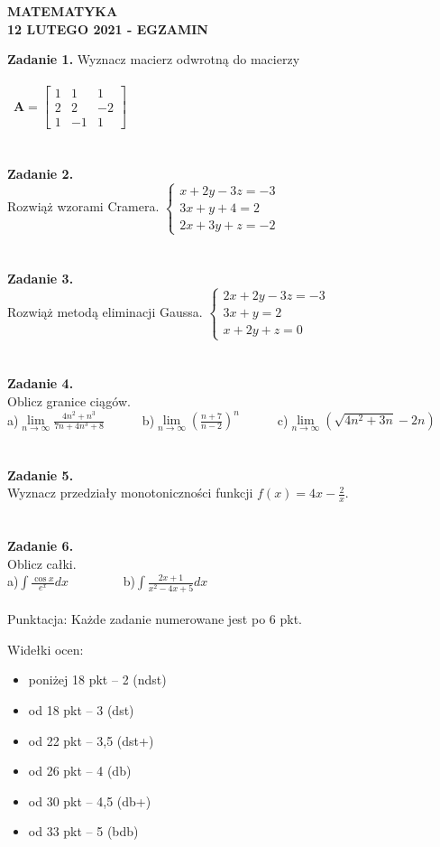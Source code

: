 \documentclass[12pt,a4paper]{report}
\begin{document}
\begin{center}

\textbf{MATEMATYKA \\12 LUTEGO 2021 - EGZAMIN}

\end{center}\textbf{Zadanie 1.} Wyznacz macierz odwrotną do macierzy \\\\\ $\mathbf{A} =\left[ \begin{array}{ccc}1 & 1& 1\\2& 2& -2\\1 & -1& 1\end{array} \right]$\\\\\\\textbf{Zadanie 2.} \\Rozwiąż wzorami Cramera. $\left\{ \begin{array}{ll}x+2y-3z=-3\\ 3x+y+4=2\\2x+3y+z=-2\end{array} \right.$\\\\\\\textbf{Zadanie 3.} \\Rozwiąż metodą eliminacji Gaussa. $\left\{ \begin{array}{ll}2x+2y-3z=-3\\3x+y=2\\x+2y+z=0\end{array} \right.$\\\\\\\textbf{Zadanie 4.} \\Oblicz granice ciągów.\\a)$\lim\limits_{n\to\infty}\frac{4n^2+n^3}{7n+4n^3+8}$\ \ \ \ \ \  b)$\lim\limits_{n\to \infty}(\frac{n+7}{n-2})^n$\ \ \ \ \ \ c)$\lim\limits_{n\to\infty}\left( \sqrt{4n^2+3n}-2n\right)$\\\\\\\textbf{Zadanie 5.} \\Wyznacz przedziały monotoniczności funkcji $f(x)=4x-\frac{2}{x}$.\\\\\\\textbf{Zadanie 6.} \\Oblicz całki. \\a)$\int \frac{\cos x}{e^x} dx$ \ \ \ \ \ \ \ \ b)$\int \frac{2x+1}{x^2-4x+5} dx$\\\\Punktacja: Każde zadanie numerowane jest po 6 pkt.



Widełki ocen:

\begin{itemize}

\item poniżej 18 pkt -- 2 (ndst)

\item od 18 pkt -- 3 (dst)

\item od 22 pkt -- 3,5 (dst+)

\item od 26 pkt -- 4 (db)

\item od 30 pkt -- 4,5 (db+)

\item od 33 pkt -- 5 (bdb)

\end{itemize}
\end{document}
